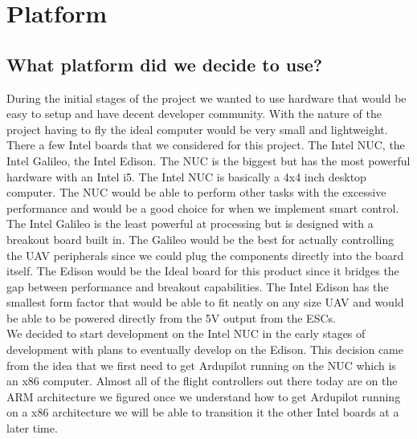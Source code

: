 \documentclass[letterpaper,10pt,notitlepage,fleqn]{article}
\begin{document}
\section{Platform}

\subsection{What platform did we decide to use?}
\indent During the initial stages of the project we wanted to use hardware that would be easy to setup and have decent developer community. With the nature of the project having to fly the ideal computer would be very small and lightweight. There a few Intel boards that we considered for this project. The Intel NUC, the Intel Galileo, the Intel Edison. The NUC is the biggest but has the most powerful hardware with an Intel i5. The Intel NUC is basically a 4x4 inch desktop computer.
The NUC would be able to perform other tasks with the excessive performance and would be a good choice for when we implement smart control. The Intel Galileo is the least powerful at processing but is designed with a breakout board built in. The Galileo would be the best for actually controlling the UAV peripherals since we could plug the components directly into the board itself. The Edison would be the Ideal board for this product since it bridges the gap between performance and breakout
capabilities. The Intel Edison has the smallest form factor that would be able to fit neatly on any size UAV and would be able to be powered directly from the 5V output from the ESCs.
\\
\indent We decided to start development on the Intel NUC in the early stages of development with plans to eventually develop on the Edison. This decision came from the idea that we first need to get Ardupilot running on the NUC which is an x86 computer. Almost all of the flight controllers out there today are on the ARM architecture we figured once we understand how to get Ardupilot running on a x86 architecture we will be able to transition it the other Intel boards at a later time.
\end{document}
